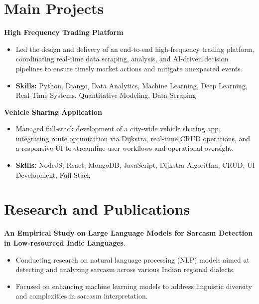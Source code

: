 \documentclass[a4paper,11pt]{article}
\begin{document}
\section{\textbf{Main Projects}}

\vspace{1mm}
  \textbf{High Frequency Trading Platform  }
\vspace{-1.5mm} %
\begin{itemize}
  \item Led the design and delivery of an end-to-end high-frequency trading platform, coordinating real-time data scraping, analysis, and AI-driven decision pipelines to ensure timely market actions and mitigate unexpected events.
\vspace{-3mm}
  \item \textbf{Skills:} Python, Django, Data Analytics, Machine Learning, Deep Learning, Real-Time Systems, Quantitative Modeling, Data Scraping
\end{itemize}


\vspace{1mm}
   \textbf{Vehicle Sharing Application }
\vspace{-1.5mm} %
\begin{itemize}
  \item Managed full-stack development of a city-wide vehicle sharing app, integrating route optimization via Dijkstra, real-time CRUD operations, and a responsive UI to streamline user workflows and operational oversight.
\vspace{-3mm}
  \item \textbf{Skills:} NodeJS, React, MongoDB, JavaScript, Dijkstra Algorithm, CRUD, UI Development, Full Stack
\end{itemize}



\section{\textbf{Research and Publications} \hfill }
\vspace{1mm}
  \textbf{An Empirical Study on Large Language Models for Sarcasm Detection in Low-resourced Indic Languages}.
\vspace{-1mm} %
\begin{itemize}
  \item Conducting research on natural language processing (NLP) models aimed at detecting and analyzing sarcasm across various Indian regional dialects.
\vspace{-3mm}
  \item Focused on enhancing machine learning models to address linguistic diversity and complexities in sarcasm interpretation.
\end{itemize}
\end{document}
